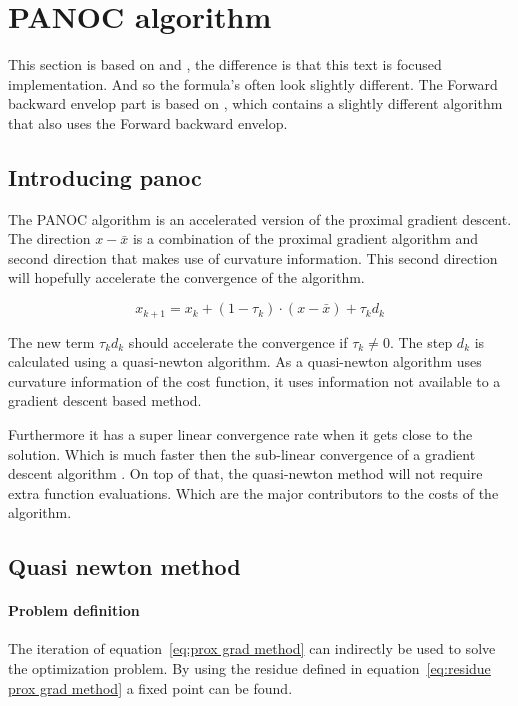 \chapter{PANOC algorithm}
	This section is based on \cite{LorenzoStella2017} and \cite{AjaySathya2017}, the difference is that this text is focused implementation. And so the formula's often look slightly different. The Forward backward envelop part is based on \cite{Themelis}, which contains a slightly different algorithm that also uses the Forward backward envelop.
	\section{Introducing panoc}
		The PANOC algorithm is an accelerated version of the proximal gradient descent. The direction  $x-\bar{x}$ is a combination of the proximal gradient algorithm and second direction that makes use of curvature information. This second direction will hopefully accelerate the convergence of the algorithm.
		
		\begin{equation}
		x_{k+1} = x_k + (1-\tau_k)\cdot (x-\bar{x}) + \tau_k d_k
		\end{equation}
		
		The new term $\tau_kd_k$ should accelerate the convergence if $\tau_k\neq0$. The step $d_k$ is calculated using a quasi-newton algorithm. As a quasi-newton algorithm uses curvature information of the cost function, it uses information not available to a gradient descent based method. 
		
		Furthermore it has a super linear convergence rate when it gets close to the solution. Which is much faster then the sub-linear convergence of a gradient descent algorithm . On top of that, the quasi-newton method will not require extra function evaluations. Which are the major contributors to the costs of the algorithm.
		
	\section{Quasi newton method}
		\subsubsection{Problem definition}
			The iteration of equation~\ref{eq:prox grad method} can indirectly be used to solve the optimization problem.  By using the residue defined in equation~\ref{eq:residue prox grad method} a fixed point can be found. 
			
